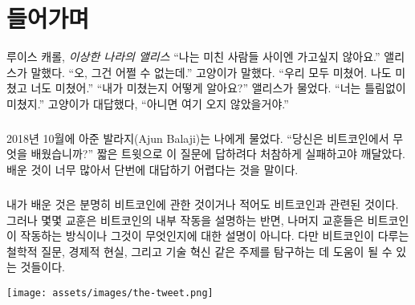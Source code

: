 \chapter*{들어가며}
\label{ch:introduction}

\begin{chapquote}{루이스 캐롤, \textit{이상한 나라의 앨리스}}
	\enquote{나는 미친 사람들 사이엔 가고싶지 않아요.} 앨리스가 말했다. 
	\enquote{오, 그건 어쩔 수 없는데.}  고양이가 말했다. 
	\enquote{우리 모두 미쳤어. 나도 미쳤고 너도 미쳤어.} 
	\enquote{내가 미쳤는지 어떻게 알아요?} 앨리스가 물었다. 
	\enquote{너는 틀림없이 미쳤지.} 고양이가 대답했다, 
	\enquote{아니면 여기 오지 않았을거야.}
\end{chapquote}


\paragraph{}
2018년 10월에 아준 발라지(Ajun Balaji)는 나에게 물었다.
\enquote{당신은 비트코인에서 무엇을 배웠습니까?} 짧은 트윗으로 이 질문에 답하려다 처참하게 실패하고야 깨달았다.
배운 것이 너무 많아서 단번에 대답하기 어렵다는 것을 말이다.

\paragraph{}
내가 배운 것은 분명히 비트코인에 관한 것이거나 적어도 비트코인과 관련된 것이다. 
그러나 몇몇 교훈은 비트코인의 내부 작동을 설명하는 반면, 나머지 교훈들은 
비트코인이 작동하는 방식이나 그것이 무엇인지에 대한 설명이 아니다.
다만 비트코인이 다루는 철학적 질문, 경제적 현실, 그리고 기술 혁신 같은 주제를 탐구하는 데 도움이 될 수 있는 것들이다. 

\begin{center}
	\texttt{[image: assets/images/the-tweet.png]}
\end{center}

